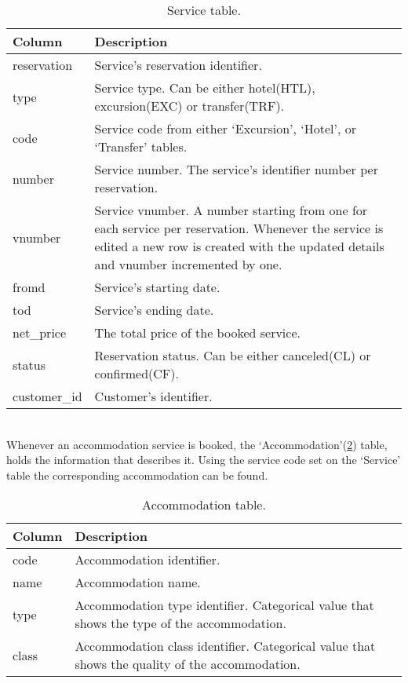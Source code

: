 \begin{table}[!htb]
\begin{center}
\begin{tabular}{l | p{12cm}}
\textcolor{theme}{\textbf{Column}} & \textcolor{theme}{\textbf{Description}}\\
\hline
reservation & Service's reservation identifier.\\
\hline
type & Service type. Can be either hotel(HTL), excursion(EXC) or transfer(TRF).\\
\hline
code & Service code from either `Excursion', `Hotel', or `Transfer' tables.\\
\hline
number & Service number. The service's identifier number per reservation.\\
\hline
vnumber & Service vnumber. A number starting from one for each service per reservation. Whenever the service is edited a new row is created with the updated details and vnumber incremented by one.\\
\hline
fromd & Service's starting date.\\
\hline
tod & Service's ending date.\\
\hline
net\_price & The total price of the booked service.\\
\hline
status & Reservation status. Can be either canceled(CL) or confirmed(CF). \\
\hline
customer\_id & Customer's identifier.\\
\hline
\end{tabular}
\caption{Service table.}
\label{tab:service}
\end{center}
\end{table}
\\
Whenever an accommodation service is booked, the `Accommodation'(\ref{tab:accommodation}) table, holds the information that describes it. Using the service code set on the `Service' table the corresponding accommodation can be found.
\begin{table}[!htb]
\begin{center}
\begin{tabular}{l | p{12cm}}
\textcolor{theme}{\textbf{Column}} & \textcolor{theme}{\textbf{Description}}\\
\hline
code & Accommodation identifier.\\
\hline
name & Accommodation name.\\
\hline
type & Accommodation type identifier. Categorical value that shows the type of the accommodation. \\
\hline
class & Accommodation class identifier. Categorical value that shows the quality of the accommodation. \\
\hline
\end{tabular}
\caption{Accommodation table.}
\label{tab:accommodation}
\end{center}
\end{table}

